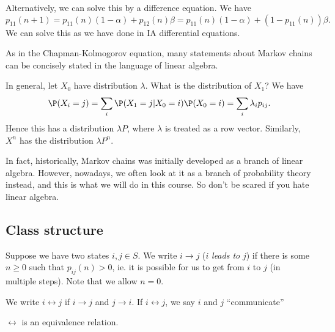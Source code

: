 \documentclass[a4paper]{article}
\begin{document}
\begin{eg}
  Alternatively, we can solve this by a difference equation. We have
  \[
    p_{11}(n + 1) = p_{11}(n)(1 - \alpha) + p_{12}(n)\beta = p_{11}(n)(1 - \alpha) + (1 - p_{11}(n))\beta.
  \]
  We can solve this as we have done in IA differential equations.
\end{eg}
As in the Chapman-Kolmogorov equation, many statements about Markov chains can be concisely stated in the language of linear algebra.

In general, let $X_0$ have distribution $\lambda$. What is the distribution of $X_1$? We have
\[
  \P(X_i = j) = \sum_i \P(X_1 = j| X_0 = i)\P(X_0 = i) = \sum_i \lambda_i p_{ij}.
\]
Hence this has a distribution $\lambda P$, where $\lambda$ is treated as a row vector. Similarly, $X^n$ has the distribution $\lambda P^n$.

In fact, historically, Markov chains was initially developed as a branch of linear algebra. However, nowadays, we often look at it as a branch of probability theory instead, and this is what we will do in this course. So don't be scared if you hate linear algebra.

\subsection{Class structure}
\begin{defi}
  Suppose we have two states $i, j\in S$. We write $i \to j$ ($i$ \emph{leads to} $j$) if there is some $n \geq 0$ such that $p_{ij}(n) > 0$, ie. it is possible for us to get from $i$ to $j$ (in multiple steps). Note that we allow $n = 0$.

  We write $i \leftrightarrow j$ if $i \to j$ and $j \to i$. If $i \leftrightarrow j$, we say $i$ and $j$ ``communicate''
\end{defi}

\begin{prop}
  $\leftrightarrow$ is an equivalence relation.
\end{prop}
\end{document}
